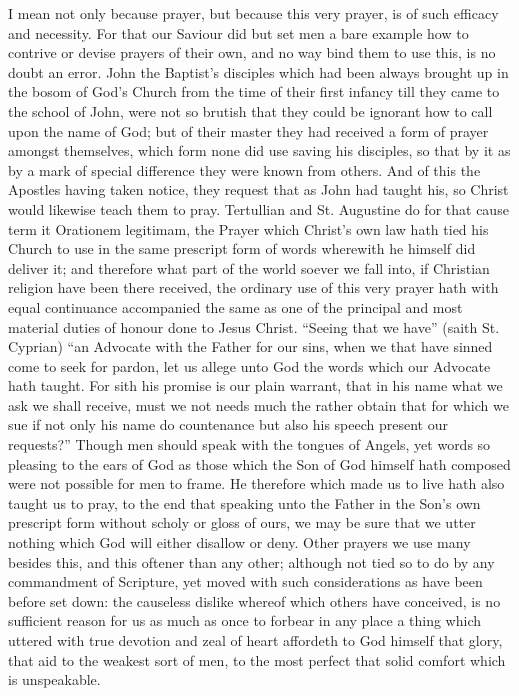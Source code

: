 I mean not only because prayer, but because this very prayer, is of such efficacy and necessity. For that our Saviour did but set men a bare example how to contrive or devise prayers of their own, and no way bind them to use this, is no doubt an error. John the Baptist’s disciples which had been always brought up in the bosom of God’s Church from the time of their first infancy till they came to the school of John, were not so brutish that they could be ignorant how to call upon the name of God; but of their master they had received a form of prayer amongst themselves, which form none did use saving his disciples, so that by it as by a mark of special difference they were known from others. And of this the Apostles having taken notice, they request that as John had taught his, so Christ would likewise teach them to pray.
Tertullian and St. Augustine do for that cause term it Orationem legitimam, the Prayer which Christ’s own law hath tied his Church to use in the same prescript form of words wherewith he himself did deliver it; and therefore what part of the world soever we fall into, if Christian religion have been there received, the ordinary use of this very prayer hath with equal continuance accompanied the same as one of the principal and most material duties of honour done to Jesus Christ. “Seeing that we have” (saith St. Cyprian) “an Advocate with the Father for our sins, when we that have sinned come to seek for pardon, let us allege unto God the words which our Advocate hath taught. For sith his promise is our plain warrant, that in his name what we ask we shall receive, must we not needs much the rather obtain that for which we sue if not only his name do countenance but also his speech present our requests?”
Though men should speak with the tongues of Angels, yet  words so pleasing to the ears of God as those which the Son of God himself hath composed were not possible for men to frame. He therefore which made us to live hath also taught us to pray, to the end that speaking unto the Father in the Son’s own prescript form without scholy or gloss of ours, we may be sure that we utter nothing which God will either disallow or deny. Other prayers we use many besides this, and this oftener than any other; although not tied so to do by any commandment of Scripture, yet moved with such considerations as have been before set down: the causeless dislike whereof which others have conceived, is no sufficient reason for us as much as once to forbear in any place a thing which uttered with true devotion and zeal of heart affordeth to God himself that glory, that aid to the weakest sort of men, to the most perfect that solid comfort which is unspeakable.

